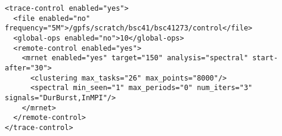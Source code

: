 \begin{verbatim}
<trace-control enabled="yes">
  <file enabled="no" frequency="5M">/gpfs/scratch/bsc41/bsc41273/control</file>
  <global-ops enabled="no">10</global-ops>
  <remote-control enabled="yes">
    <mrnet enabled="yes" target="150" analysis="spectral" start-after="30">
      <clustering max_tasks="26" max_points="8000"/>
      <spectral min_seen="1" max_periods="0" num_iters="3" signals="DurBurst,InMPI"/>
    </mrnet>
  </remote-control>
</trace-control> 
\end{verbatim}

